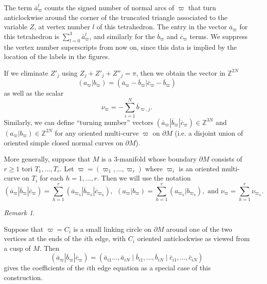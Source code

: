 \documentclass[12pt]{amsart}
\theoremstyle{definition}
\theoremstyle{remark}
\newtheorem{rmk}[thm]{Remark}
\def\Z{\mathbb{Z}}
\def\lbl{\label}
\def\be{  \begin{equation} }
\def\ee{  \end{equation} }
\def\bd{\partial}
\begin{document}
The term $\bar a_\varpi^l$ counts the signed number of normal arcs of $\varpi$ that turn anticlockwise around the corner of the truncated triangle associated to the variable $Z$, at vertex number $l$ of this tetrahedron. The entry in the vector $\overline{a}_{\varpi}$ for this tetrahedron is $\sum_{l=0}^3 \bar a_\varpi^l$, and similarly for the $\overline{b}_{\varpi}$ and $\overline{c}_{\varpi}$ terms. We suppress the vertex number superscripts from now on, since this data is implied by the location of the labels in the figures.

If we eliminate $Z'_j$ using $Z_j+Z'_j+Z''_j = \pi$, then we obtain the vector in $\Z^{2N}$
\be
(a_{\varpi}|b_{\varpi})=(\overline{a}_{\varpi}-\overline{b}_{\varpi}|
\overline{c}_{\varpi}-\overline{b}_{\varpi})
\ee
as well as the scalar 
\be\nu_{\varpi}=-\sum_{i=1}^N \overline{b}_{\varpi,j}.\ee
Similarly, we can define ``turning number'' vectors $(\overline{a}_{\varpi}|\overline{b}_{\varpi}|\overline{c}_{\varpi}) \in \Z^{3N}$
and $(a_{\varpi}|b_{\varpi}) \in \Z^{2N}$ for any oriented multi-curve $\varpi$ on $\bd M$ (i.e. a disjoint union of oriented simple closed normal curves on $\bd M$).

More generally, suppose that $M$ is a 3-manifold whose boundary $\bd M$ consists of $r \ge 1$ tori
$T_1, \ldots, T_r$. Let $\varpi=(\varpi_1, \ldots, \varpi_r)$ where $\varpi_i$ is an oriented multi-curve on $T_i$ for each $h=1, \ldots , r$.
Then we will use the notation 
\begin{equation}
\lbl{eq.nupi}
(\overline{a}_{\varpi}|\overline{b}_{\varpi}|\overline{c}_{\varpi}) = \sum_{h=1}^r 
(\overline{a}_{\varpi_h}|\overline{b}_{\varpi_h}|\overline{c}_{\varpi_h}),~~
(a_{\varpi}|b_{\varpi})= \sum_{h=1}^r  (a_{\varpi_h}|b_{\varpi_h}), \text{ and }
\nu_{\varpi} = \sum_{h=1}^r \nu_{\varpi_h}.
\end{equation}

\begin{rmk} \label{edge_eqn_as_holonomy}

Suppose that $\varpi=C_i$ is a small linking circle on $\bd M$ around 
one of the two vertices at the ends of the $i$th edge, with $C_i$ oriented 
anticlockwise as viewed from a cusp of $M$. Then 
$$(\overline{a}_{\varpi}|\overline{b}_{\varpi}|\overline{c}_{\varpi}) = 
(\bar a_{i1} \ldots, \bar a_{iN} \mid  \bar b_{i1}, \ldots, \bar b_{iN} \mid \bar c_{i1}, \ldots, \bar c_{iN})$$
 gives the coefficients of the $i$th edge equation as a special case of this construction. 

\end{rmk}
\end{document}
